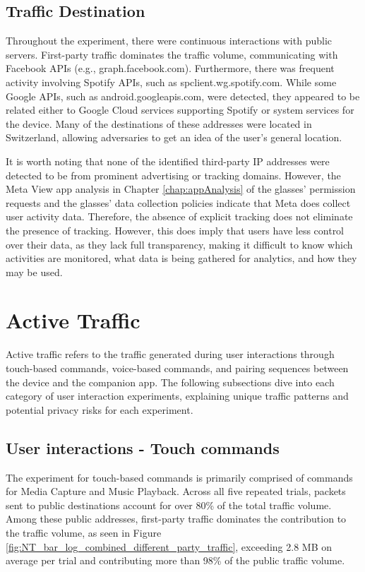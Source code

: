 \subsection*{Traffic Destination}
Throughout the experiment, there were continuous interactions with public servers. First-party traffic dominates the traffic volume, communicating with Facebook APIs (e.g., graph.facebook.com). Furthermore,  there was frequent activity involving Spotify APIs, such as spclient.wg.spotify.com. While some Google APIs, such as android.googleapis.com, were detected, they appeared to be related either to Google Cloud services supporting Spotify or system services for the device. Many of the destinations of these addresses were located in Switzerland, allowing adversaries to get an idea of the user's general location.

It is worth noting that none of the identified third-party IP addresses were detected to be from prominent advertising or tracking domains. However, the Meta View app analysis in Chapter \ref{chap:appAnalysis} of the glasses' permission requests and the glasses' data collection policies \cite{GlassesPrivacyPolicy} indicate that Meta does collect user activity data. Therefore, the absence of explicit tracking does not eliminate the presence of tracking. However, this does imply that users have less control over their data, as they lack full transparency, making it difficult to know which activities are monitored, what data is being gathered for analytics, and how they may be used.


\section{Active Traffic}
Active traffic refers to the traffic generated during user interactions through touch-based commands, voice-based commands, and pairing sequences between the device and the companion app. The following subsections dive into each category of user interaction experiments, explaining unique traffic patterns and potential privacy risks for each experiment.

\subsection{User interactions - Touch commands}

The experiment for touch-based commands is primarily comprised of commands for Media Capture and Music Playback. Across all five repeated trials, packets sent to public destinations account for over 80\% of the total traffic volume. Among these public addresses, first-party traffic dominates the contribution to the traffic volume, as seen in Figure \ref{fig:NT_bar_log_combined_different_party_traffic}, exceeding 2.8 MB on average per trial and contributing more than 98\% of the public traffic volume. 

